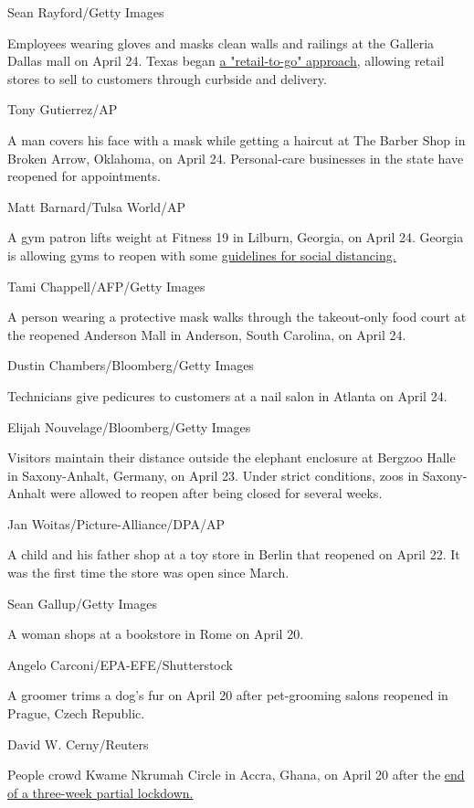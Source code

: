 Sean Rayford/Getty Images

Employees wearing gloves and masks clean walls and railings at the
Galleria Dallas mall on April 24. Texas began
\href{https://www.cnn.com/us/live-news/us-coronavirus-update-04-22-20/h_6d32b70e83f15222e94e15a2a05e169b}{a
"retail-to-go" approach,} allowing retail stores to sell to customers
through curbside and delivery.

Tony Gutierrez/AP

A man covers his face with a mask while getting a haircut at The Barber
Shop in Broken Arrow, Oklahoma, on April 24. Personal-care businesses in
the state have reopened for appointments.

Matt Barnard/Tulsa World/AP

A gym patron lifts weight at Fitness 19 in Lilburn, Georgia, on April
24. Georgia is allowing gyms to reopen with some
\href{https://www.cnn.com/2020/04/24/us/georgia-coronavirus-reopening-businesses-friday/index.html}{guidelines
for social distancing.}

Tami Chappell/AFP/Getty Images

A person wearing a protective mask walks through the takeout-only food
court at the reopened Anderson Mall in Anderson, South Carolina, on
April 24.

Dustin Chambers/Bloomberg/Getty Images

Technicians give pedicures to customers at a nail salon in Atlanta on
April 24.

Elijah Nouvelage/Bloomberg/Getty Images

Visitors maintain their distance outside the elephant enclosure at
Bergzoo Halle in Saxony-Anhalt, Germany, on April 23. Under strict
conditions, zoos in Saxony-Anhalt were allowed to reopen after being
closed for several weeks.

Jan Woitas/Picture-Alliance/DPA/AP

A child and his father shop at a toy store in Berlin that reopened on
April 22. It was the first time the store was open since March.

Sean Gallup/Getty Images

A woman shops at a bookstore in Rome on April 20.

Angelo Carconi/EPA-EFE/Shutterstock

A groomer trims a dog's fur on April 20 after pet-grooming salons
reopened in Prague, Czech Republic.

David W. Cerny/Reuters

People crowd Kwame Nkrumah Circle in Accra, Ghana, on April 20 after the
\href{https://www.cnn.com/2020/04/20/africa/ghana-ends-lockdown-intl/index.html}{end
of a three-week partial lockdown.}

